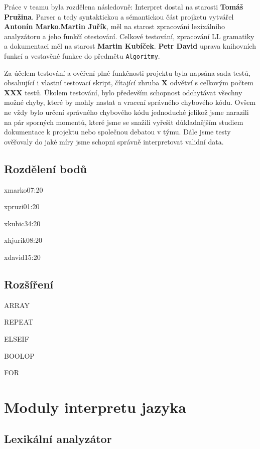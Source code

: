 \documentclass[12pt,a4paper,titlepage,final]{article}
\begin{document}
Práce v teamu byla rozdělena následovně: Interpret dostal na starosti \textbf{Tomáš Pružina}. Parser a tedy syntaktickou a sémantickou část projketu vytvářel \textbf{Antonín Marko}.\textbf{Martin Juřík}, měl na starost zpracování lexixálního analyzátoru a jeho funkčí otestování. Celkové testování, zpracování LL gramatiky a dokumentaci měl na starost \textbf{Martin Kubíček}. \textbf{Petr David} uprava knihovních funkcí a vestavěné funkce do předmětu \verb|Algoritmy|.\newline

Za účelem testování a ověření plné funkčnosti projektu byla napsána sada testů, obsahující i vlastní testovací skript, čítající zhruba \textbf{X} odvětví s celkovým počtem \textbf{XXX} testů. Úkolem testování, bylo především schopnost odchytávat všechny možné chyby, které by mohly nastat a vracení správného chybového kódu. Ovšem ne vždy bylo určení správného chybového kódu jednoduché jelikož jsme narazili na pár sporných momentů, které jsme se snažili vyřešit důkladnějším studiem dokumentace k projektu nebo společnou debatou v týmu. Dále jsme testy ověřovaly do jaké míry jsme schopni správně interpretovat validní data.



\subsection{Rozdělení bodů}
xmarko07:20

xpruzi01:20

xkubic34:20

xhjurik08:20

xdavid15:20

\subsection{Rozšíření}
ARRAY

REPEAT

ELSEIF

BOOLOP

FOR

\pagebreak
\section{Moduly interpretu jazyka} \label{moduly_interpretu}
\subsection{Lexikální analyzátor} \label{lexikalni_analyzator}
\end{document}
